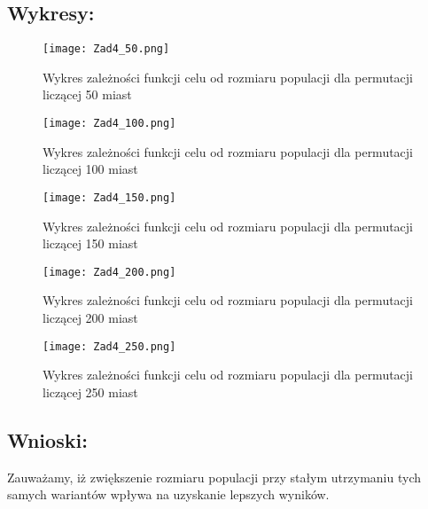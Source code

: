   \subsection{Wykresy: }
  \begin{figure}[H]
    \texttt{[image: Zad4\_50.png]}
    \centering
    \caption{Wykres zależności funkcji celu od rozmiaru populacji dla permutacji liczącej 50 miast}
  \end{figure}
  \begin{figure}[H]
    \texttt{[image: Zad4\_100.png]}
    \centering
    \caption{Wykres zależności funkcji celu od rozmiaru populacji dla permutacji liczącej 100 miast}
  \end{figure}
  \begin{figure}[H]
    \texttt{[image: Zad4\_150.png]}
    \centering
    \caption{Wykres zależności funkcji celu od rozmiaru populacji dla permutacji liczącej 150 miast}
  \end{figure}
  \begin{figure}[H]
    \texttt{[image: Zad4\_200.png]}
    \centering
    \caption{Wykres zależności funkcji celu od rozmiaru populacji dla permutacji liczącej 200 miast}
  \end{figure}
  \begin{figure}[H]
    \texttt{[image: Zad4\_250.png]}
    \centering
    \caption{Wykres zależności funkcji celu od rozmiaru populacji dla permutacji liczącej 250 miast}
  \end{figure}
  \subsection{Wnioski: }
      Zauważamy, iż zwiększenie rozmiaru populacji przy stałym utrzymaniu tych samych wariantów wpływa na uzyskanie lepszych wyników.
